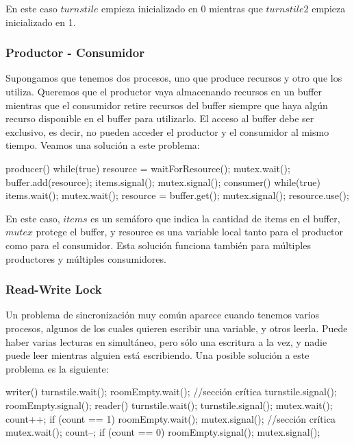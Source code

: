 \documentclass{article}
\begin{document}
En este caso $turnstile$ empieza inicializado en 0 mientras que $turnstile2$ empieza inicializado en 1.

\subsubsection{Productor - Consumidor}

Supongamos que tenemos dos procesos, uno que produce recursos y otro que los utiliza. Queremos que el productor vaya almacenando recursos en un buffer mientras que el consumidor retire recursos del buffer siempre que haya alg\'un recurso disponible en el buffer para utilizarlo. El acceso al buffer debe ser exclusivo, es decir, no pueden acceder el productor y el consumidor al mismo tiempo. Veamos una soluci\'on a este problema:

\begin{code}
producer()
{
    while(true)
		{
        resource = waitForResource();
    		mutex.wait();
		        buffer.add(resource);
				    items.signal();
	      mutex.signal();
		}
}
consumer()
{
    while(true)
		{
		    items.wait();
				mutex.wait();
				    resource = buffer.get();
			  mutex.signal();
				resource.use();
		}
}
\end{code}

En este caso, $items$ es un sem\'aforo que indica la cantidad de items en el buffer, $mutex$ protege el buffer, y resource es una variable local tanto para el productor como para el consumidor. Esta soluci\'on funciona tambi\'en para m\'ultiples productores y m\'ultiples consumidores.

\subsubsection{Read-Write Lock}

Un problema de sincronizaci\'on muy com\'un aparece cuando tenemos varios procesos, algunos de los cuales quieren escribir una variable, y otros leerla. Puede haber varias lecturas en simult\'aneo, pero s\'olo una escritura a la vez, y nadie puede leer mientras alguien est\'a escribiendo. Una posible soluci\'on a este problema es la siguiente:

\begin{code}
writer()
{
    turnstile.wait();
		    roomEmpty.wait();
				//sección crítica
		turnstile.signal();
		roomEmpty.signal();
}
reader()
{
    turnstile.wait();
		turnstile.signal();
		mutex.wait();
		    count++;
				if (count == 1)
				    roomEmpty.wait();
		mutex.signal();
		//sección crítica
		mutex.wait();
		    count--;
				if (count == 0)
				    roomEmpty.signal();
	  mutex.signal();
}
\end{code}
\end{document}
